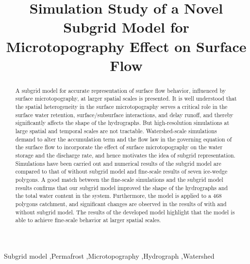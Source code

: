 \documentclass[review,11pt]{elsarticle}
\begin{document}
\begin{frontmatter}

\title{Simulation Study of a Novel Subgrid Model for Microtopography Effect on Surface Flow}







\begin{abstract}
A subgrid model for accurate representation of surface flow behavior, influenced by surface microtopography, at larger spatial scales is presented.
It is well understood that the spatial heterogeneity in the surface microtopography serves a critical role in the surface water retention, surface/subsurface interactions, and delay runoff, and thereby significantly affects the shape of the hydrographs. But high-resolution simulations at large spatial and temporal scales are not tractable. Watershed-scale simulations demand to alter the accumulation term and the flow law in the governing equation of the surface flow to incorporate the effect of surface microtopography on the water storage and the discharge rate, and hence motivates the idea of subgrid representation. Simulations have been carried out and numerical results of the subgrid model are compared to that of without subgrid model and fine-scale results of seven ice-wedge polygons. A good match between the fine-scale simulations and the subgrid model results confirms that our subgrid model improved the shape of the hydrographs and the total water content in the system. Furthermore, the model is applied to a 468 polygons catchment, and significant changes are observed in the results of with and without subgrid model. The results of the developed model highlight that the model is able to achieve fine-scale behavior at larger spatial scales.
\end{abstract}

\begin{keyword}
Subgrid model \sep Permafrost \sep Microtopography  \sep Hydrograph \sep Watershed
\end{keyword}


\end{frontmatter}
\end{document}
